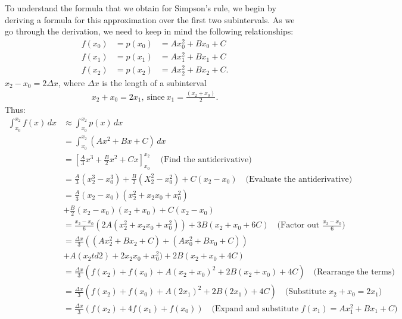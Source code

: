 \documentclass{report}
\begin{document}
        \pagebreak \bigbreak \noindent 
        To understand the formula that we obtain for Simpson’s rule, we begin by deriving a formula for this approximation over the first two subintervals. As we go through the derivation, we need to keep in mind the following relationships:
        \begin{align*}
            f(x_0) &= p(x_0) &= Ax_0^2 + Bx_0 + C \\
            f(x_1) &= p(x_1) &= Ax_1^2 + Bx_1 + C \\
            f(x_2) &= p(x_2) &= Ax_2^2 + Bx_2 + C
        .\end{align*}
        $x_2 - x_0 = 2 \Delta x$, where $\Delta x $ is the length of a subinterval
        \begin{align*}
            x_{2} + x_{0} = 2x_{1},\ \text{since}\ x_{1} = \frac{(x_{2} + x_{0})}{2}
        .\end{align*}
        Thus:
        \begin{align*}
            \int_{x_0}^{x_2} f(x) \, dx &\approx \int_{x_0}^{x_2} p(x) \, dx \\
            &= \int_{x_0}^{x_2} (Ax^2 + Bx + C) \, dx \\
            &= \left[ \frac{A}{3}x^3 + \frac{B}{2}x^2 + Cx \right]_{x_0}^{x_2}\ \quad \text{(Find the antiderivative)} \\
            &=\frac{A}{3}(x_{2}^{3}-x_{0}^{3}) + \frac{B}{2}(X_{2}^{2}-x_{0}^{2})+C(x_{2}-x_{0}) \quad \text{(Evaluate the antiderivative)} \\
            &=\frac{A}{3}(x_{2}-x_{0})(x_{2}^{2}+x_{2}x_{0}+x_{0}^{2}) \\
            &+\frac{B}{2}(x_{2}-x_{0})(x_{2}+x_{0})+  C(x_{2}-x_{0}) \\
            &=\frac{x_{2}-x_{0}}{6}(2A(x_{2}^{2}+x_{2}x_{0}+x_{0}^{2})) + 3B(x_{2} +x_{0} + 6C) \quad \text{(Factor out $\frac{x_{2}-x_{0}}{6} $)} \\
            &=\frac{\Delta x}{3}((Ax_{2}^{2} + Bx_{2} + C) +(Ax_{0}^{2}+Bx_{0}+ C)) \\
            &+A(x_{2}td2)+2x_{2}x_{0}+x_{0}^{2}) + 2B(x_{2}+x_{0} + 4C) \\
            &=\frac{\Delta x}{3}(f(x_{2})+f(x_{0})+A(x_{2}+x_{0})^{2}+2B(x_{2}+x_{0}) + 4C) \quad \text{(Rearrange the terms)} \\
            &=\frac{\Delta x}{3}(f(x_{2})+f(x_{0})+A(2x_{1})^{2}+2B(2x_{1})+4C) \quad \text{(Substitute $x_{2} + x_{0}  = 2x_{1}$)} \\
            &=\frac{\Delta x}{3}(f(x_{2})+4f(x_{1}) +f(x_{0})) \quad \text{(Expand and substitute $f(x_{1}) = Ax_{1}^{2} + Bx_{1} + C$)}
        \end{align*}
\end{document}
